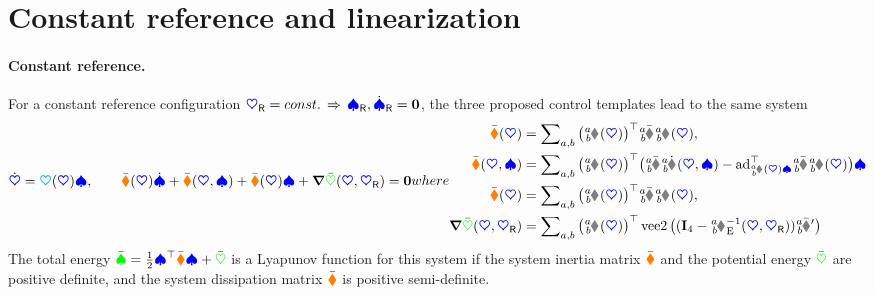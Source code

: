 \section{Constant reference and linearization}\label{sec:CtrlLinearization}
\paragraph{Constant reference.}
For a constant reference configuration $\boldsymbol{\textcolor{blue}{\heartsuit}}_{\mathsf{R}} = const. \, \Rightarrow \, \boldsymbol{\textcolor{blue}{\spadesuit}}_{\mathsf{R}}, \dot{\boldsymbol{\textcolor{blue}{\spadesuit}}}_{\mathsf{R}} = \boldsymbol{0}$, the three proposed control templates lead to the same system
\begin{subequations}
\label{eq:ClosedLoopStab}
\begin{align}
 \sysCoordd = \kinMat(\sysCoord) \sysVel,
\qquad
 \sysInertiaMatC(\sysCoord) \sysVeld + \gyroForceC(\sysCoord, \sysVel) + \sysDissMatC(\sysCoord)\sysVel + \differential \potentialEnergyC(\sysCoord, \sysCoordR) = \tuple{0}
\end{align}
where
\begin{align}
 \sysInertiaMatC(\sysCoord) &= \sumBodiesAB \big(\bodyJac{\BidxI}{\BidxII}(\sysCoord)\big)^\top \bodyInertiaMatC{\BidxI}{\BidxII} \bodyJac{\BidxI}{\BidxII}(\sysCoord),
\\
 \gyroForceC(\sysCoord, \sysVel) &= \sumBodiesAB \big(\bodyJac{\BidxI}{\BidxII}(\sysCoord)\big)^\top \big(\bodyInertiaMatC{\BidxI}{\BidxII} \bodyJacd{\BidxI}{\BidxII}(\sysCoord, \sysVel) - \ad{\bodyJac{\BidxI}{\BidxII}(\sysCoord)\sysVel}^\top \bodyInertiaMatC{\BidxI}{\BidxII}\bodyJac{\BidxI}{\BidxII}(\sysCoord) \big) \sysVel
\\
 \sysDissMatC(\sysCoord) &= \sumBodiesAB \big(\bodyJac{\BidxI}{\BidxII}(\sysCoord)\big)^\top \bodyDissMatC{\BidxI}{\BidxII} \bodyJac{\BidxI}{\BidxII}(\sysCoord),
\\
 \differential \potentialEnergyC(\sysCoord, \sysCoordR) &= \sumBodiesAB \big(\bodyJac{\BidxI}{\BidxII}(\sysCoord)\big)^\top \veeTwoOp \big( (\idMat[4] - \bodyHomoCoordE{\BidxI}{\BidxII}^{-1}(\sysCoord,\sysCoordR)) \bodyStiffMatCp{\BidxI}{\BidxII} \big)
\end{align} 
\end{subequations}
The total energy $\bar{\textcolor{green}{\spadesuit}} = \tfrac{1}{2} \boldsymbol{\textcolor{blue}{\spadesuit}}^\top \bar{\boldsymbol{\textcolor{orange}{\blacklozenge}}} \boldsymbol{\textcolor{blue}{\spadesuit}} + \bar{\textcolor{green}{\heartsuit}}$ is a Lyapunov function for this system if the system inertia matrix $\bar{\boldsymbol{\textcolor{orange}{\blacklozenge}}}$ and the potential energy $\bar{\textcolor{green}{\heartsuit}}$ are positive definite, and the system dissipation matrix $\bar{\boldsymbol{\textcolor{orange}{\blacklozenge}}}$ is positive semi-definite. 

